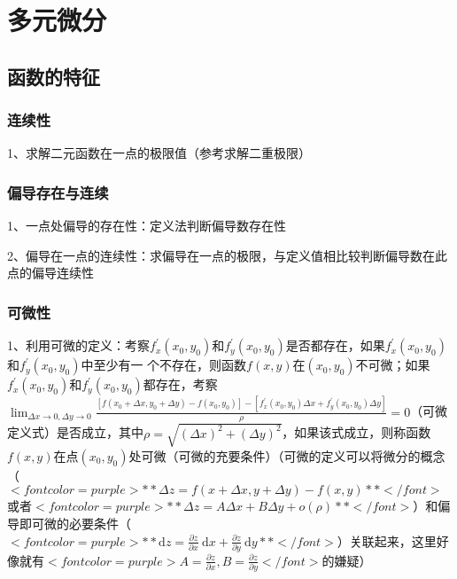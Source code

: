 \chapter{多元微分}

\section{函数的特征}



\subsection{连续性}

1、求解二元函数在一点的极限值（参考求解二重极限）



\subsection{偏导存在与连续}

1、一点处偏导的存在性：定义法判断偏导数存在性

2、偏导在一点的连续性：求偏导在一点的极限，与定义值相比较判断偏导数在此点的偏导连续性



\subsection{可微性}

1、利用可微的定义：考察$ f_{x}^{\prime}\left(x_{0}, y_{0}\right)和f_{y}^{\prime}\left(x_{0}, y_{0}\right) $是否都存在，如果$ f_{x}^{\prime}\left(x_{0}, y_{0}\right) $和$ f_{y}^{\prime}\left(x_{0}, y_{0}\right) $中至少有一 个不存在，则函数$ f(x, y) $在$ \left(x_{0}, y_{0}\right) $不可微；如果$ f_{x}^{\prime}\left(x_{0}, y_{0}\right) $和$ f_{y}^{\prime}\left(x_{0}, y_{0}\right) $都存在，考察$ \lim_{\Delta x \rightarrow 0,\Delta y \rightarrow 0}\frac{\left[f\left(x_{0}+\Delta x, y_{0}+\Delta y\right)-f\left(x_{0}, y_{0}\right)\right]-\left[f_{x}^{\prime}\left(x_{0}, y_{0}\right) \Delta x+f_{y}^{\prime}\left(x_{0}, y_{0}\right) \Delta y\right]}{\rho}=0 $（可微定义式）是否成立，其中$ \rho=\sqrt{(\Delta x)^{2}+(\Delta y)^{2}} $，如果该式成立，则称函数$ f(x, y) $在点$ (x_0, y_0) $处可微（可微的充要条件）（可微的定义可以将微分的概念（$ <font color=purple>**\Delta z=f(x+\Delta x, y+\Delta y)-f(x, y)**</font> $或者$ <font color=purple>**\Delta z=A \Delta x+B \Delta y+o(\rho)**</font> $）和偏导即可微的必要条件（$ <font color=purple>**\mathrm{d} z=\frac{\partial z}{\partial x} \mathrm{~d} x+\frac{\partial z}{\partial y} \mathrm{~d} y**</font> $）关联起来，这里好像就有$ <font color=purple>A=\frac{\partial z}{\partial x},B=\frac{\partial z}{\partial y}</font> $的嫌疑）


